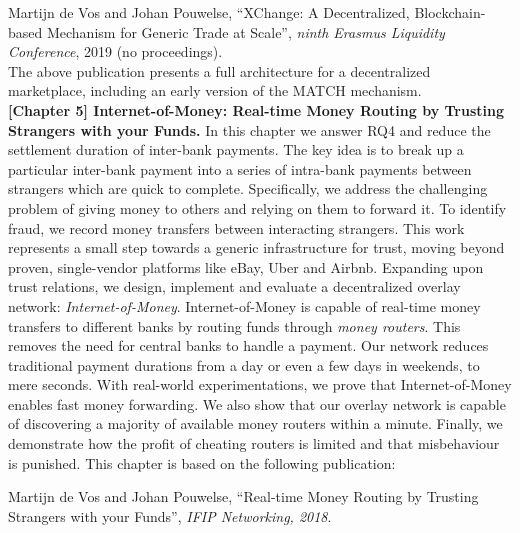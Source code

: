 Martijn de Vos and Johan Pouwelse, \enquote{XChange: A Decentralized, Blockchain-based Mechanism for Generic Trade at Scale}, \emph{ninth Erasmus Liquidity Conference}, 2019 (no proceedings).\\

The above publication presents a full architecture for a decentralized marketplace, including an early version of the MATCH mechanism.\\

\textbf{[Chapter 5] Internet-of-Money: Real-time Money Routing by Trusting Strangers with your Funds.}
In this chapter we answer RQ4 and reduce the settlement duration of inter-bank payments.
The key idea is to break up a particular inter-bank payment into a series of intra-bank payments between strangers which are quick to complete.
Specifically, we address the challenging problem of giving money to others and relying on them to forward it.
To identify fraud, we record money transfers between interacting strangers.
This work represents a small step towards a generic infrastructure for trust, moving beyond proven, single-vendor platforms like eBay, Uber and Airbnb.
Expanding upon trust relations, we design, implement and evaluate a decentralized overlay network: \emph{Internet-of-Money}.
Internet-of-Money is capable of real-time money transfers to different banks by routing funds through \emph{money routers}.
This removes the need for central banks to handle a payment.
Our network reduces traditional payment durations from a day or even a few days in weekends, to mere seconds.
With real-world experimentations, we prove that Internet-of-Money enables fast money forwarding.
We also show that our overlay network is capable of discovering a majority of available money routers within a minute.
Finally, we demonstrate how the profit of cheating routers is limited and that misbehaviour is punished.
This chapter is based on the following publication:

Martijn de Vos and Johan Pouwelse, \enquote{Real-time Money Routing by Trusting Strangers with your Funds}, \emph{IFIP Networking, 2018}.\\


